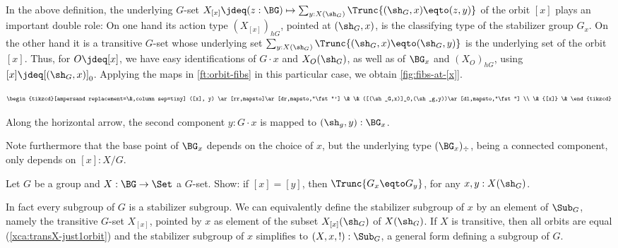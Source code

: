\begin{remark}\label{rem:orbit-fibs}
In the above definition, the underlying $G$-set $X_{[x]} \jdeq
(z:\BG)\mapsto\sum_{y:X(\sh_G)}\Trunc{(\sh_G,x)\eqto(z,y)}$
of the orbit $[x]$ plays an important double role: On one hand its
action type $(X_{[x]})_{hG}$,
pointed at $(\sh_G,x)$, is the classifying type of the stabilizer
group $G_x$. On the other hand it is a transitive $G$-set whose
underlying set $\sum_{y:X(\sh_G)}\Trunc{(\sh_G,x)\eqto(\sh_G,y)}$
is the underlying set of the orbit $[x]$. Thus,
for $O\jdeq[x]$, we have easy identifications of $G\cdot x$ and $X_O(\sh_G)$,
as well as of $\BG_x$ and $(X_O)_{hG}$, using $[x]\jdeq[(\sh_G,x)]_0$.
Applying the maps in \cref{ft:orbit-fibs} in this particular case, 
we obtain \cref{fig:fibs-at-[x]}.
\begin{marginfigure}
  \[\footnotesize %
    \begin{tikzcd}[ampersand replacement=\&,column sep=tiny]
      ([x], y) \ar[rr,mapsto]\ar[dr,mapsto,"\fst"']
      \& \& ([(\sh_G,x)]_0,(\sh_g,y))\ar[dl,mapsto,"\fst"] \\
      \& {[x]} \&
    \end{tikzcd}
  \]
  \caption{\label{fig:fibs-at-[x]}Along the horizontal arrow,
  the second component $y:G\cdot x$ is mapped to $(\sh_g,y):\BG_x$.}
\end{marginfigure}

Note furthermore that the base point of $\BG_x$ depends on the choice of $x$,
but the underlying type $(\BG_x)_\div$, being a connected component,
only depends on $[x]:X/G$.
\end{remark}

\begin{xca}\label{xca:[x]=[y]-implies-||Gx=Gy||}
Let $G$ be a group and $X: \BG\to\Set$ a $G$-set. Show:
if $[x]=[y]$, then $\Trunc{G_x\eqto G_y}$, for any $x,y:X(\sh_G)$.
\end{xca}

\begin{remark}\label{rem:subgrp-is-stabsubgr}
  In fact every subgroup of $G$ is a stabilizer subgroup.
  We can equivalently define the stabilizer subgroup of $x$ 
  by an element of $\Sub_G$, namely
  the transitive $G$-set $X_{[x]}$, pointed by
  $x$ as element of the subset $X_{[x]}(\sh_G)$ of $X(\sh_G)$.
  If $X$ is transitive, then all orbits are equal (\cref{xca:transX-just1orbit})
  and the stabilizer subgroup of $x$ simplifies to $(X,x,!):\Sub_G$,
  a general form defining a subgroup of $G$.
\end{remark}


